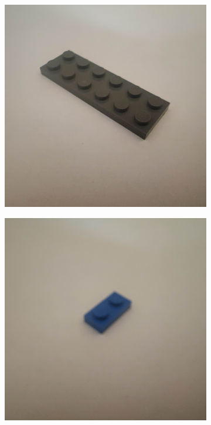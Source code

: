 \documentclass[]{article}
\begin{document}
\begin{figure}[h]
\begin{subfigure}[b]{0.2\textwidth}
    \end{subfigure}
    \begin{subfigure}[b]{0.2\textwidth}
        \includegraphics[width=\textwidth]{photographed images/21.jpg}
    \end{subfigure}
    \begin{subfigure}[b]{0.2\textwidth}
        \includegraphics[width=\textwidth]{photographed images/22.jpg}

\end{subfigure}
\end{figure}
\end{document}
